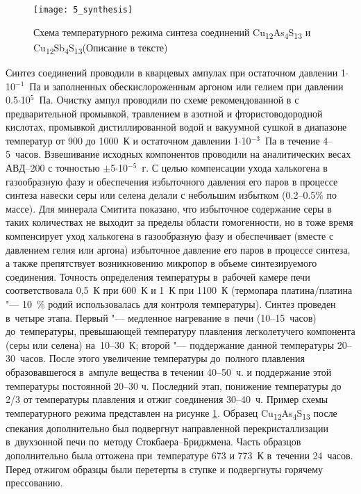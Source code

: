 \begin{figure}[pt!]
  \begin{minipage}[ht]{0.99\linewidth}\centering
    \texttt{[image: 5\_synthesis]} 
  \end{minipage}
       \caption[Схема температурного режима синтеза соединений Cu\textsubscript{12}As\textsubscript{4}S\textsubscript{13} и Cu\textsubscript{12}Sb\textsubscript{4}S\textsubscript{13}]{Схема температурного режима синтеза соединений Cu\textsubscript{12}As\textsubscript{4}S\textsubscript{13} и Cu\textsubscript{12}Sb\textsubscript{4}S\textsubscript{13}(Описание в тексте)}
    \label{img:figure3}
\end{figure}

Синтез соединений проводили в кварцевых ампулах при остаточном давлении 1$\cdot$10$^{-1}$~Па и заполненных обескислороженным аргоном или гелием при давлении 0.5$\cdot$10$^{5}$~Па. Очистку ампул проводили по схеме рекомендованной в \cite{156} с предварительной промывкой, травлением в азотной и фтористоводородной кислотах, промывкой дистиллированной водой и вакуумной сушкой в диапазоне температур от 900 до 1000~К и остаточном давлении 1$\cdot$10$^{-3}$~Па в течение 4--5~часов. Взвешивание исходных компонентов проводили на аналитических весах АВД--200 с точностью $\pm$5$\cdot$10$^{-5}$~г. 
С целью компенсации ухода халькогена в газообразную фазу и обеспечения избыточного давления его паров в процессе синтеза навески серы или селена делали с небольшим избытком (0.2--0.5\% по массе). 
Для минерала Смитита показано\cite{181}, что избыточное содержание серы в таких количествах не выходит за пределы области гомогенности, но в тоже время компенсирует уход халькогена в газообразную фазу и обеспечивает (вместе с давлением гелия или аргона) избыточное давление его паров в процессе синтеза, а также препятствует возникновению микропор в объеме синтезируемого соединения. 
Точность определения температуры в~рабочей камере печи соответствовала 0,5~К при 600~К и 1~К при 1100~К (термопара платина/платина "--- 10~\% родий использовалась для контроля температуры). Синтез проведен в~четыре этапа. Первый "--- медленное нагревание в~печи (10--15~часов) до~температуры, превышающей температуру плавления легколетучего компонента (серы или селена) на~10--30~К; второй "--- поддержание данной температуры 20--30~часов. После этого увеличение температуры до~полного плавления образовавшегося в~ампуле вещества в течении 40--50~ч. и поддержание этой температуры постоянной 20--30 ч. Последний этап, понижение температуры до 2/3 от температуры плавления и отжиг соединения 30--40~ч.
 Пример схемы температурного режима представлен на рисунке \ref{img:figure3}. Образец Cu\textsubscript{12}As\textsubscript{4}S\textsubscript{13} после спекания дополнительно был подвергнут направленной перекристаллизации в~двухзонной печи по~методу Стокбаера--Бриджмена. Часть образцов дополнительно была оттожена при~температуре 673 и 773~К в~течении 24~часов. 
Перед отжигом образцы были перетерты в ступке и подвергнуты горячему прессованию. 

